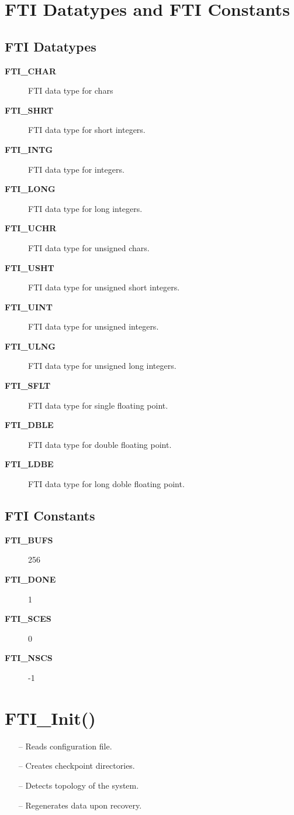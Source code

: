 \documentclass{refrep}
\begin{document}
\section{FTI Datatypes and FTI Constants}\label{sec:datatypesandconstants}
\subsection{FTI Datatypes}
\begin{description}
\item[\textbf{FTI\_CHAR}] FTI data type for chars
\item[\textbf{FTI\_SHRT}] FTI data type for short integers.
\item[\textbf{FTI\_INTG}] FTI data type for integers.
\item[\textbf{FTI\_LONG}] FTI data type for long integers.
\item[\textbf{FTI\_UCHR}] FTI data type for unsigned chars.
\item[\textbf{FTI\_USHT}] FTI data type for unsigned short integers.
\item[\textbf{FTI\_UINT}] FTI data type for unsigned integers.
\item[\textbf{FTI\_ULNG}] FTI data type for unsigned long integers.
\item[\textbf{FTI\_SFLT}] FTI data type for single floating point.
\item[\textbf{FTI\_DBLE}] FTI data type for double floating point.
\item[\textbf{FTI\_LDBE}] FTI data type for long doble floating point.
\end{description}
\subsection{FTI Constants}
\begin{description}
\item[\textbf{FTI\_BUFS}] 256
\item[\textbf{FTI\_DONE}] 1
\item[\textbf{FTI\_SCES}] 0
\item[\textbf{FTI\_NSCS}] -1
\end{description}
\newpage
\section{\asciifamily FTI\_Init()}\label{sec:ftiinit}
\begin{framed}
\begin{itemize}
\item[--] Reads configuration file.
\item[--] Creates checkpoint directories.
\item[--] Detects topology of the system.
\item[--] Regenerates data upon recovery.
\end{itemize}
\end{framed}
\end{document}
